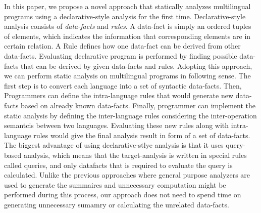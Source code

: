 In this paper, we propose a novel approach that statically analyzes
multilingual programs using a declarative-style analysis for the first time.
Declarative-style analysis consists of \textit{data-facts} and \textit{rules}.
A data-fact is simply an ordered tuples of elements, which indicates the
information that corresponding elements are in certain relation. A Rule defines
how one data-fact can be derived from other data-facts. Evaluating declarative
program is performed by finding possible data-facts that can be derived by
given data-facts and rules.  Adopting this approach, we can perform static
analysis on multilingual programs in following sense.  The first step is to
convert each language into a set of syntactic data-facts.  Then, Programmers
can define the intra-language rules that would generate new data-facts based on
already known data-facts. Finally, programmer can implement the static analysis
by defining the inter-language rules considering the inter-operation semantcis
between two languages. Evaluating these new rules along with intra-language
rules would give the final analysis result in form of a set of data-facts.
The biggest advantage of using declarative-stlye analysis is that it uses
query-based analysis, which means that the target-analysis is written in
special rules called queries, and only datafacts that is required to evaluate
the query is calculated. Unlike the previous approaches where general purpose
analyzers are used to generate the summaires and unnecessary computation might
be performed during this process, our approach does not need to spend time
on generating unnecessary sumamry or calculating the unrelated data-facts.



